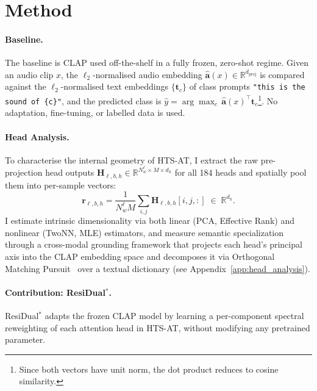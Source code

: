 \section{Method}
\label{sec:method}

\paragraph{Baseline.}
The baseline is CLAP used off-the-shelf in a fully frozen, 
zero-shot regime. 
Given an audio clip $x$, the $\ell_2$-normalised audio embedding 
$\hat{\mathbf{a}}(x) \in \mathbb{R}^{d_{\mathrm{proj}}}$ is compared against 
the $\ell_2$-normalised text embeddings $\{\mathbf{t}_c\}$ of class prompts 
\texttt{"this is the sound of \{c\}"}, and the predicted class is 
$\hat{y} = \arg\max_c\, \hat{\mathbf{a}}(x)^\top \mathbf{t}_c$\footnote{Since both 
vectors have unit norm, the dot product reduces to cosine similarity.}.
No adaptation, fine-tuning, or labelled data is used.

\paragraph{Head Analysis.}
To characterise the internal geometry of HTS-AT, I extract the raw 
pre-projection head outputs 
$\mathbf{H}_{\ell,b,h} \in \mathbb{R}^{N_w^\ell \times M \times d_h}$ 
for all 184 heads and spatially pool them into per-sample vectors:
\begin{equation}
    \mathbf{r}_{\ell,b,h}
    = \frac{1}{N_w^\ell M}
      \sum_{i,j} \mathbf{H}_{\ell,b,h}[i,j,:]
    \;\in\; \mathbb{R}^{d_h}.
\end{equation}
I estimate intrinsic dimensionality via both linear (PCA, Effective Rank) 
and nonlinear (TwoNN, MLE) estimators, 
and measure semantic specialization through a cross-modal grounding framework 
that projects each head's principal axis into the CLAP embedding space 
and decomposes it via Orthogonal Matching Pursuit~\cite{OrthogonalMatchingPursuit} over a textual dictionary
(see Appendix~\ref{app:head_analysis}).

\paragraph{Contribution: ResiDual$^*$.}
ResiDual$^*$ adapts the frozen CLAP model by learning a per-component 
spectral reweighting of each attention head in HTS-AT, 
without modifying any pretrained parameter. 

